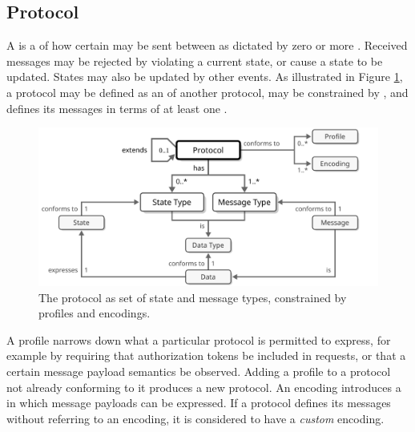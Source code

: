 \subsection{Protocol}
\label{sec:concepts:protocol}

A  is a  of how certain  may be sent between  as dictated by zero or more .
Received messages may be rejected by violating a current state, or cause a state to be updated.
States may also be updated by other events. 
As illustrated in Figure \ref{fig:protocol}, a protocol may be defined as an  of another protocol, may be constrained by , and defines its messages in terms of at least one .

\begin{figure}[ht!]
  \centering
  \includegraphics[scale=0.9]{figures/protocol}
  \caption{
    The protocol as set of state and message types, constrained by profiles and encodings.
  }
  \label{fig:protocol}
\end{figure}

A profile narrows down what a particular protocol is permitted to express, for example by requiring that authorization tokens be included in requests, or that a certain message payload semantics be observed.
Adding a profile to a protocol not already conforming to it produces a new protocol.
An encoding introduces a  in which message payloads can be expressed.
If a protocol defines its messages without referring to an encoding, it is considered to have a \textit{custom} encoding.
